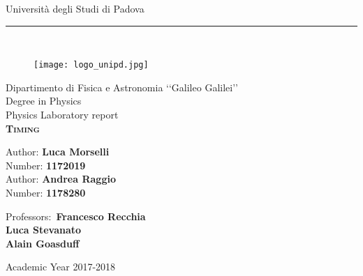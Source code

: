 \begin{titlepage}
	
	\begin{center}
		\LARGE{Università degli Studi di Padova}\\
		\noindent\rule{12cm}{0.4pt}\\
		\begin{figure}[H]
			\centering
			\texttt{[image: logo\_unipd.jpg]}
		\end{figure}
		\vspace{-0.2em}
		\Large{Dipartimento di Fisica e Astronomia ‘‘Galileo Galilei’’}\\
		\vspace{2em}
		\Large{Degree in Physics}\\
		\vspace{2em}
		\normalsize{Physics Laboratory report}\\
		\vspace{3.5em}
		\LARGE{\textsc{\textbf{Timing}}}\\
		\vspace{3em}
		\begin{flushleft}
			\Large{Author: \textbf{Luca Morselli}}\\
			\Large{Number: \textbf{1172019}}\\
			\vspace{0.5em}
			\Large{Author: \textbf{Andrea Raggio}}\\
			\Large{Number: \textbf{1178280}}
		\end{flushleft}
		\vspace{2em}
	\end{center}
	\begin{flushright}
		\normalsize{Professors:~\textbf{Francesco Recchia\\Luca Stevanato\\Alain Goasduff}}
	\end{flushright}
	\begin{center}
		\vspace{2.5em}
		\LARGE{Academic Year 2017-2018}\\
	\end{center}
	
\end{titlepage}
